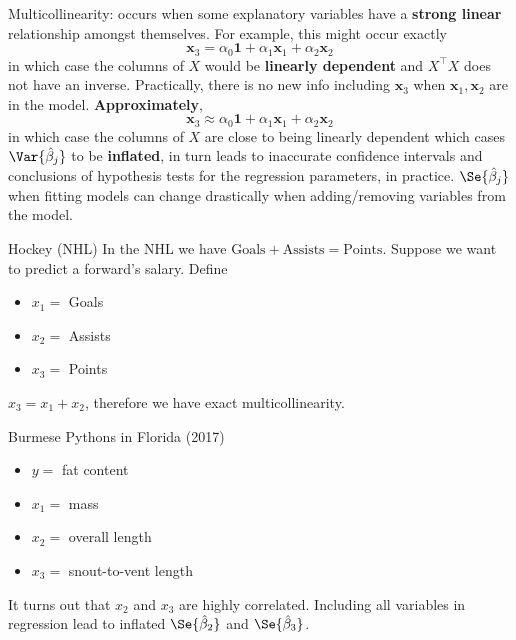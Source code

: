 Multicollinearity: occurs when some explanatory
variables have a \textbf{strong linear}
relationship amongst themselves. For example,
this might occur exactly
\[ \symbf{x}_3=\alpha_0\symbf{1}+\alpha_1\symbf{x}_1+\alpha_2\symbf{x}_2 \]
in which case the columns of $ X $ would be \textbf{linearly dependent}
and $ X^\top X $ does not have an inverse. Practically,
there is no new info including $ \symbf{x}_3 $
when $ \symbf{x}_1,\symbf{x}_2 $ are in the model.
\textbf{Approximately},
\[ \symbf{x}_3\approx \alpha_0\symbf{1}+\alpha_1\symbf{x}_1+\alpha_2\symbf{x}_2 \]
in which case the columns of $ X $ are close to being
linearly dependent which cases $ \Var{\hat{\beta}_j} $
to be \textbf{inflated}, in turn leads to inaccurate confidence
intervals and conclusions of hypothesis tests
for the regression parameters, in practice.
$ \Se{\hat{\beta}_j} $ when fitting models can change drastically
when adding/removing variables from the model.

\begin{Example}{Hockey (NHL)}{}
    In the NHL we have $ \text{Goals}+\text{Assists}=\text{Points} $.
    Suppose we want to predict a forward's salary. Define
    \begin{itemize}
        \item $ x_1= $ Goals
        \item $ x_2= $ Assists
        \item $ x_3= $ Points
    \end{itemize}
    $ x_3=x_1+x_2 $, therefore we have exact multicollinearity.
\end{Example}
\begin{Example}{Burmese Pythons in Florida (2017)}{}
    \begin{itemize}
        \item $ y= $ fat content
        \item $ x_1= $ mass
        \item $ x_2= $ overall length
        \item $ x_3= $ snout-to-vent length
    \end{itemize}
    It turns out that $ x_2 $ and $ x_3 $ are highly
    correlated. Including all variables in
    regression lead to inflated $ \Se{\hat{\beta}_2} $
    and $ \Se{\hat{\beta}_3} $.
\end{Example}

